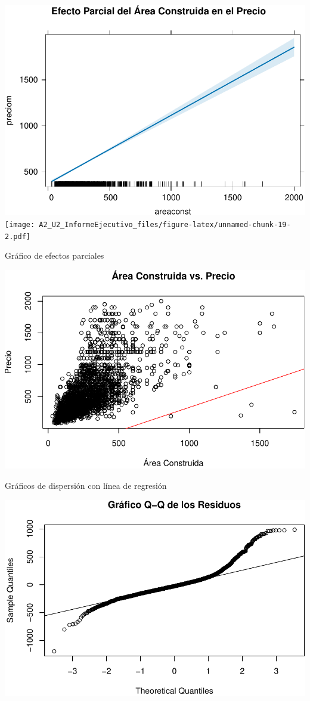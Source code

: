 \documentclass[
]{article}
\begin{document}
\includegraphics{A2_U2_InformeEjecutivo_files/figure-latex/unnamed-chunk-19-1.pdf}
\texttt{[image: A2\_U2\_InformeEjecutivo\_files/figure-latex/unnamed-chunk-19-2.pdf]}

Gráfico de efectos parciales

\includegraphics{A2_U2_InformeEjecutivo_files/figure-latex/unnamed-chunk-20-1.pdf}

Gráficos de dispersión con línea de regresión

\includegraphics{A2_U2_InformeEjecutivo_files/figure-latex/unnamed-chunk-21-1.pdf}
\end{document}
